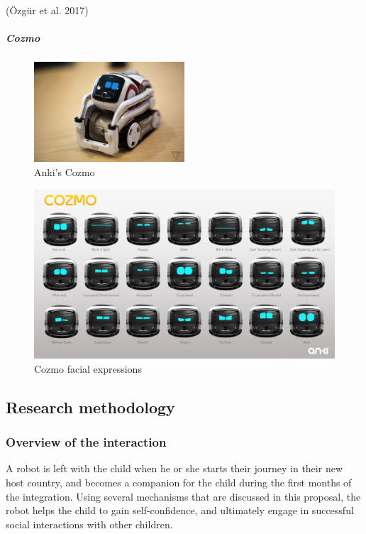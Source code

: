 \documentclass[]{article}
\begin{document}
(Özgür et al. 2017)

\subparagraph{Cozmo}\label{cozmo}

\begin{figure}
\centering
\includegraphics[width=0.5\textwidth,height=\textheight]{figs/anki-cozmo.jpg}
\caption{Anki's Cozmo}
\end{figure}

\begin{figure}
\centering
\includegraphics{figs/cozmo-expression-sheet.jpg}
\caption{Cozmo facial expressions}
\end{figure}

\subsection{Research methodology}\label{research-methodology}

\subsubsection{Overview of the interaction}\label{overview-of-the-interaction}

A robot is left with the child when he or she starts their journey in
their new host country, and becomes a companion for the child during the
first months of the integration. Using several mechanisms that are
discussed in this proposal, the robot helps the child to gain
self-confidence, and ultimately engage in successful social interactions
with other children.
\end{document}
